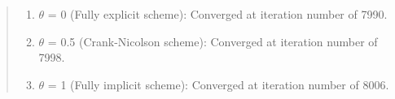 \documentclass[letterpaper,10pt,english]{sphinxmanual}
\begin{document}
\begin{quote}
\begin{enumerate}
\item {} 
\(\theta\) = 0 (Fully explicit scheme): Converged at iteration number of 7990.

\end{enumerate}
\begin{figure}[htbp]
\centering

\noindent{}
\end{figure}
\begin{figure}[htbp]
\centering

\noindent{}
\end{figure}
\begin{enumerate}
\setcounter{enumi}{1}
\item {} 
\(\theta\) = 0.5 (Crank-Nicolson scheme): Converged at iteration number of 7998.

\end{enumerate}
\begin{figure}[htbp]
\centering

\noindent{}
\end{figure}
\begin{figure}[htbp]
\centering

\noindent{}
\end{figure}
\begin{enumerate}
\setcounter{enumi}{2}
\item {} 
\(\theta\) = 1 (Fully implicit scheme): Converged at iteration number of 8006.

\end{enumerate}
\begin{figure}[htbp]
\centering

\noindent{}
\end{figure}
\begin{figure}[htbp]
\centering

\noindent{}
\end{figure}
\end{quote}
\end{document}
